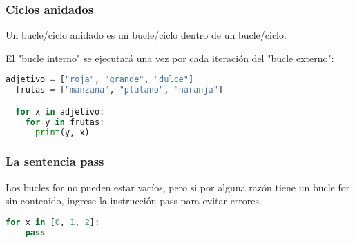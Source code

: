 \begin{frame}[fragile]
  \frametitle{Ciclos anidados}

  Un bucle/ciclo anidado es un bucle/ciclo dentro de un bucle/ciclo.

  \vspace{\baselineskip}
  El "bucle interno" se ejecutará una vez por cada iteración del
  "bucle externo":

  \vspace{\baselineskip}
  \begin{lstlisting}[language=Python]
  adjetivo = ["roja", "grande", "dulce"]
  frutas = ["manzana", "platano", "naranja"]

  for x in adjetivo:
    for y in frutas:
      print(y, x)
  \end{lstlisting}
\end{frame}

\begin{frame}[fragile]
  \frametitle{La sentencia \textbf{pass}}

  Los bucles for no pueden estar vacíos, pero si por alguna
  razón tiene un bucle for sin contenido, ingrese la instrucción
  pass para evitar errores.

  \vspace{\baselineskip}
  \begin{lstlisting}[language=Python]
  for x in [0, 1, 2]:
    pass
  \end{lstlisting}
\end{frame}

